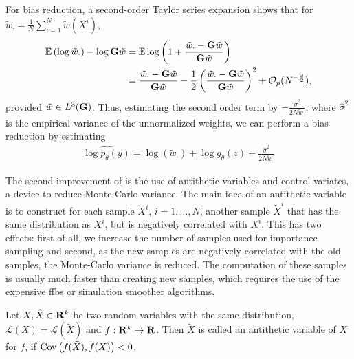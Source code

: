 For bias reduction, a second-order Taylor series expansion shows that for $\tilde{w}_\cdot = \frac{1}{N} \sum_{i =1}^N \tilde w(X^{i})$,
\begin{align*}
    \mathbb E \left(\log \tilde{w}_\cdot\right) - \log \mathbf G \tilde w &= \mathbb E \log \left(1 + \frac{\tilde{w}_\cdot - \mathbf G \tilde w}{\mathbf G \tilde w} \right)\\
                                                           &=  \frac{\tilde{w}_\cdot - \mathbf G \tilde w}{\mathbf G \tilde w}  - \frac{1}{2} \left(\frac{\tilde{w}_\cdot - \mathbf G \tilde w}{\mathbf G \tilde w} \right)^{2} + \mathcal O_{p}(N^{-\frac{3}{2}}),
\end{align*}
provided $\tilde w \in L^{3}(\mathbf G)$. Thus, estimating the second order term by $- \frac{\hat\sigma^2}{2N \tilde{w}_\cdot} $, where $\hat \sigma^{2}$ is the empirical variance of the unnormalized weights, we can perform a bias reduction by estimating 
\begin{align}
    \label{eq:loglik-hat-bias-reduction}
    \widehat{\log p_{\theta}(y)} = \log \left(\tilde w_{\cdot}\right) + \log g_{\theta}(z) + \frac{\hat\sigma^{2}}{2N\tilde w_{\cdot}}
\end{align}

The second improvement of \citep{Durbin1997Monte} is the use of antithetic variables and control variates, a device to reduce Monte-Carlo variance. The main idea of an antithetic variable is to construct for each sample $X^{i}$, $i = 1,\dots, N$, another sample $\tilde X^{i}$ that has the same distribution as $X^{i}$, but is negatively correlated with $X^{i}$. This has two effects: first of all, we increase the number of samples used for importance sampling and second, as the new samples are negatively correlated with the old samples, the Monte-Carlo variance is reduced. The computation of these samples is usually much faster than creating new samples, which requires the use of the expensive \acrshort{ffbs} or simulation smoother algorithms. 
\begin{definition}
    Let $X, \tilde X\in\mathbf R^{k}$ be two random variables with the same distribution, $\mathcal L (X) = \mathcal L(\tilde X)$ and $f: \mathbf R^{k} \to \mathbf R$. Then $\tilde X$ is called an antithetic variable of $X$ for $f$, if $\operatorname{Cov} \left( f(\tilde X), f(X) \right) < 0$.
\end{definition}

